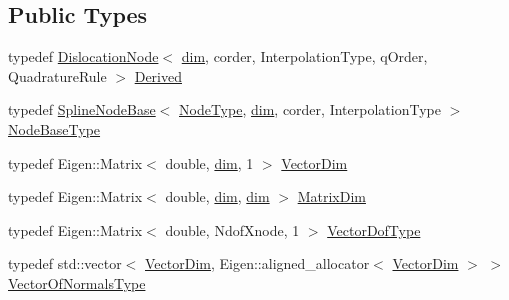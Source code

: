 \subsection*{Public Types}
\begin{DoxyCompactItemize}
\item 
typedef \hyperlink{classmodel_1_1_dislocation_node}{Dislocation\+Node}$<$ \hyperlink{classmodel_1_1_dislocation_node_abba8c89236dd4715f60c798aa12873eb}{dim}, corder, Interpolation\+Type, q\+Order, Quadrature\+Rule $>$ \hyperlink{classmodel_1_1_dislocation_node_a8897d6a9187952a267bb5a539dd69beb}{Derived}
\item 
typedef \hyperlink{classmodel_1_1_spline_node_base}{Spline\+Node\+Base}$<$ \hyperlink{_network_typedefs_8h_a723f680c66f6a92647827790bcbafce0}{Node\+Type}, \hyperlink{classmodel_1_1_dislocation_node_abba8c89236dd4715f60c798aa12873eb}{dim}, corder, Interpolation\+Type $>$ \hyperlink{classmodel_1_1_dislocation_node_a1266b6e427448fc1fdac3e926837d802}{Node\+Base\+Type}
\item 
typedef Eigen\+::\+Matrix$<$ double, \hyperlink{classmodel_1_1_dislocation_node_abba8c89236dd4715f60c798aa12873eb}{dim}, 1 $>$ \hyperlink{classmodel_1_1_dislocation_node_a24f59a87745e7b05b151b5f5017172b0}{Vector\+Dim}
\item 
typedef Eigen\+::\+Matrix$<$ double, \hyperlink{classmodel_1_1_dislocation_node_abba8c89236dd4715f60c798aa12873eb}{dim}, \hyperlink{classmodel_1_1_dislocation_node_abba8c89236dd4715f60c798aa12873eb}{dim} $>$ \hyperlink{classmodel_1_1_dislocation_node_a7de028e95588e033ed38538bd2e77a51}{Matrix\+Dim}
\item 
typedef Eigen\+::\+Matrix$<$ double, Ndof\+Xnode, 1 $>$ \hyperlink{classmodel_1_1_dislocation_node_a7def555ec4b0751177d47d703c8f9282}{Vector\+Dof\+Type}
\item 
typedef std\+::vector$<$ \hyperlink{classmodel_1_1_dislocation_node_a24f59a87745e7b05b151b5f5017172b0}{Vector\+Dim}, Eigen\+::aligned\+\_\+allocator$<$ \hyperlink{classmodel_1_1_dislocation_node_a24f59a87745e7b05b151b5f5017172b0}{Vector\+Dim} $>$ $>$ \hyperlink{classmodel_1_1_dislocation_node_a56f2de43c8df74c51f544b23f3b64540}{Vector\+Of\+Normals\+Type}
\end{DoxyCompactItemize}
